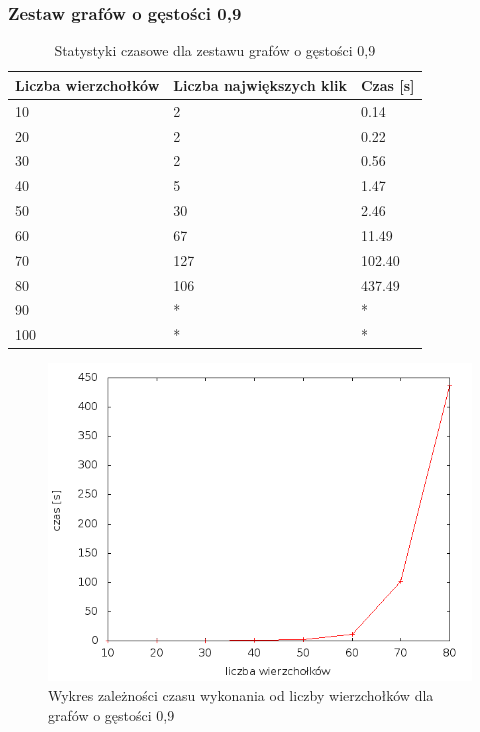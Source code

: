\documentclass[12pt, a4paper]{article}
\begin{document}
\subsubsection*{Zestaw grafów o gęstości 0,9}
\begin{table}[H]
\caption{Statystyki czasowe dla zestawu grafów o gęstości 0,9}
\begin{center}
    \begin{tabular}{|l|l|l|}
    \hline
    Liczba wierzchołków & Liczba największych klik & Czas [s] \\ \hline
    10 & 2 & 0.14 \\ \hline
    20 & 2 & 0.22 \\ \hline
    30 & 2 & 0.56 \\ \hline
    40 & 5 & 1.47 \\ \hline
    50 & 30 & 2.46 \\ \hline
    60 & 67 & 11.49 \\ \hline
    70 & 127 & 102.40 \\ \hline
    80 & 106 & 437.49 \\ \hline
    90 & * & * \\ \hline
    100 & * & * \\ \hline
    \end{tabular}
\end{center}
\end{table}

\begin{figure}[h]
    \begin{center}
	\includegraphics[scale=0.5]{../experiment_1/img/den/den_09.png}
	\caption{Wykres zależności czasu wykonania od liczby wierzchołków dla grafów o gęstości 0,9}
    \end{center}
\end{figure}
\end{document}
